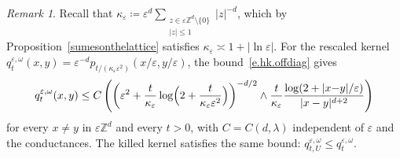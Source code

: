 \documentclass[11pt]{amsart}
\theoremstyle{plain}
\theoremstyle{definition}
\theoremstyle{remark}
\newtheorem{remark}[theorem]{Remark}
\newcommand{\Zd}{\mathbb{Z}^d}
\newcommand{\eps}{\varepsilon}
\begin{document}
	\begin{remark}
		Recall that $\kappa_\eps \coloneqq \eps^d\sum_{\substack{z \in \eps\Zd \setminus \{0\} \\ |z| \le 1}}|z|^{-d}$, which by Proposition~\ref{sumesonthelattice} satisfies $\kappa_\eps \asymp 1 + |\ln\eps|$.
		For the rescaled kernel $q_t^{\eps,\omega}(x,y) = \eps^{-d}p_{t/(\kappa_\eps\eps^2)}(x/\eps, y/\eps)$, the bound~\eqref{e.hk.offdiag} gives
		\begin{equation}
			\label{e.hk.offdiag.rescaled}
			q_t^{\eps,\omega}(x,y) \le C\left(\left(\eps^2 + \frac{t}{\kappa_\eps}\log\Bigl(2 + \frac{t}{\kappa_\eps\eps^2}\Bigr)\right)^{-d/2} \wedge \frac{t}{\kappa_\eps}\frac{\log(2 + |x{-}y|/\eps)}{|x-y|^{d+2}}\right)
		\end{equation}
		for every $x \ne y$ in $\eps\Zd$ and every $t > 0$, with $C = C(d,\lambda)$ independent of $\eps$ and the conductances.
		The killed kernel satisfies the same bound: $q_{t,U}^{\eps,\omega} \le q_t^{\eps,\omega}$.
	\end{remark}
	
	
	
\end{document}
